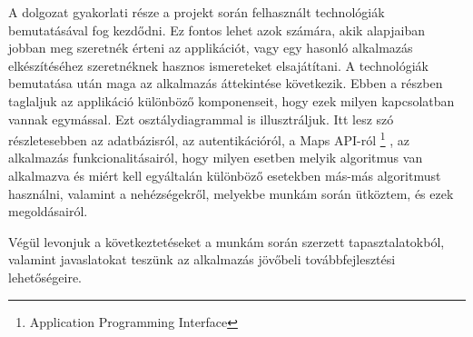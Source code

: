 A dolgozat gyakorlati része a projekt során felhasznált technológiák bemutatásával fog kezdődni. Ez fontos lehet azok számára, akik alapjaiban jobban meg szeretnék érteni az applikációt, vagy egy hasonló alkalmazás elkészítéséhez szeretnéknek hasznos ismereteket elsajátítani. A technológiák bemutatása után maga az alkalmazás áttekintése következik. Ebben a részben taglaljuk az applikáció különböző komponenseit, hogy ezek milyen kapcsolatban vannak egymással. Ezt osztálydiagrammal is illusztráljuk. Itt lesz szó részletesebben az adatbázisról, az autentikációról, a Maps API-ról%
\footnote{ %
	Application Programming Interface
}  %
, az alkalmazás funkcionalitásairól, hogy milyen esetben melyik algoritmus van alkalmazva és miért kell egyáltalán különböző esetekben más-más algoritmust használni, valamint a nehézségekről, melyekbe munkám során ütköztem, és ezek megoldásairól.

Végül levonjuk a következtetéseket a munkám során szerzett tapasztalatokból, valamint javaslatokat teszünk az alkalmazás jövőbeli továbbfejlesztési lehetőségeire.
